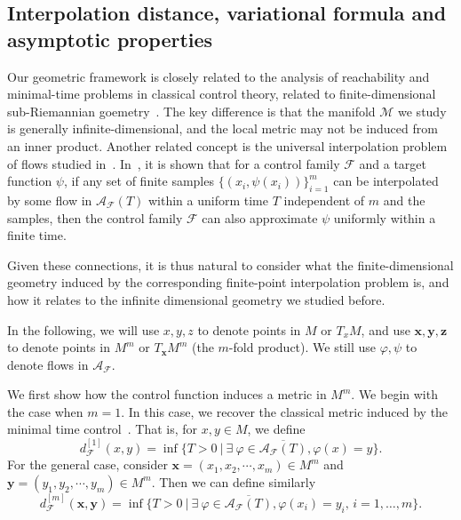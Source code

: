 \documentclass[12pt]{amsart}
\numberwithin{equation}{section}
\theoremstyle{remark}
\newcommand{\ql}[1]{\texttt{\color{cyan} QL: \footnotesize #1}}
\begin{document}
\subsection{Interpolation distance, variational formula and asymptotic properties}



Our geometric framework is closely related to the analysis of reachability and minimal-time problems
in classical control theory, related to finite-dimensional sub-Riemannian goemetry~\cite{montgomery2002tour,agrachev2019comprehensive}.
The key difference is that the manifold $\mathcal M$ we study is generally infinite-dimensional,
and the local metric may not be induced from an inner product.
Another related concept is the universal interpolation problem of flows studied in~\cite{cheng2025interpolation,cuchiero2020deep}. In~\cite{cheng2025interpolation}, it is shown that for a control family $\mathcal F$ and a target function $\psi$, if any set of finite samples $\{(x_i, \psi(x_i))\}_{i=1}^m$ can be interpolated by some flow in $\mathcal A_{\mathcal F}(T)$ within a uniform time $T$ independent of $m$ and the samples, then the control family $\mathcal F$ can also approximate $\psi$ uniformly within a finite time.

Given these connections, it is thus natural to consider what the finite-dimensional geometry induced by the corresponding finite-point interpolation problem is, and how it relates to the infinite dimensional geometry we studied before.

In the following, we will use $x, y, z$ to denote points in $M$ or $T_xM$, and use $\mathbf x, \mathbf y, \mathbf z$ to denote points in $M^m$ or $T_{\mathbf x} M^m$ (the $m$-fold product). We still use $\varphi,\psi$ to denote flows in $\mathcal A_{\mathcal F}$.

We first show how the control function induces a metric in $M^m$.
We begin with the case when $m = 1$. In this case, we recover the classical metric induced by the minimal time control~\cite{sontag2013mathematical}.
That is, for $x, y \in M$, we define
\begin{equation}
  d_{\mathcal F}^{[1]}(x,y) = \inf\{ T > 0 ~|~ \exists ~\varphi \in \overline{\mathcal A_{\mathcal F}(T)}, \varphi(x) = y \}.
\end{equation}
For the general case, consider $\mathbf{x} = (x_1,x_2,\cdots, x_m) \in M^m$ and $\mathbf{y} = (y_1,y_2,\cdots, y_m) \in M^m$. Then we can define similarly
\begin{equation}
  d_{\mathcal F}^{[m]}(\mathbf{x},\mathbf{y}) = \inf\{ T > 0 ~|~ \exists~ \varphi \in \overline{\mathcal A_{\mathcal F}(T)}, \varphi(x_i) = y_i,
  \,i=1,\dots,m
  \}.
\end{equation}
\end{document}
